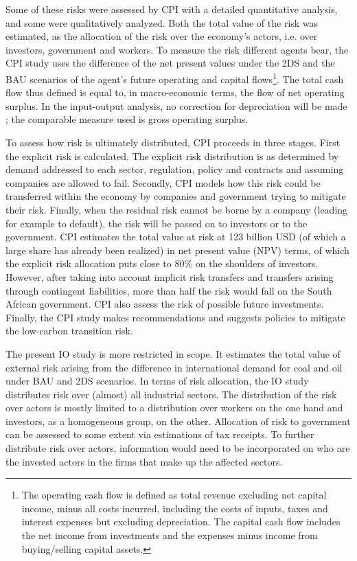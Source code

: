 \documentclass[12pt,english]{article}
\begin{document}
Some of these risks were assessed by CPI with a detailed quantitative analysis, and some were qualitatively analyzed. Both the total value of the risk was estimated, as the allocation of the risk over the economy's actors, i.e. over investors, government and workers. To measure the risk different agents bear, the CPI study uses the difference of the net present values under the 2DS and the BAU scenarios of the agent's future operating and capital flows\footnote{The operating cash flow is defined as total revenue excluding net capital income, minus all costs incurred, including the costs of inputs, taxes and interest expenses but excluding depreciation. The capital cash flow includes the net income from investments and the expenses minus income from buying/selling capital assets.}. The total cash flow thus defined is equal to, in macro-economic terms, the flow of net operating surplus. In the input-output analysis, no correction for depreciation will be made ; the comparable measure used is gross operating surplus.

To assess how risk is ultimately distributed, CPI proceeds in three stages. First the explicit risk is calculated. The explicit risk distribution is as determined by demand addressed to each sector, regulation, policy and contracts and assuming companies are allowed to fail. Secondly, CPI models how this risk could be transferred within the economy by companies and government trying to mitigate their risk. Finally, when the residual risk cannot be borne by a company (leading for example to default), the risk will be passed on to investors or to the government. 
CPI estimates the total value at risk at 123 billion USD (of which a large share has already been realized) in net present value (NPV) terms, of which the explicit risk allocation puts close to 80\% on the shoulders of investors. However, after taking into account implicit risk transfers and transfers arising through contingent liabilities, more than half the risk would fall on the South African government. CPI also assess the risk of possible future investments. Finally, the CPI study makes recommendations and suggests policies to mitigate the low-carbon transition risk.

The present IO study is more restricted in scope. It estimates the total value of external risk arising from the difference in international demand for coal and oil under BAU and 2DS scenarios. In terms of risk allocation, the IO study distributes risk over (almost) all industrial sectors. The distribution of the risk over actors is mostly limited to a distribution over workers on the one hand and investors, as a homogeneous group, on the other. Allocation of risk to government can be assessed to some extent via estimations of tax receipts. To further distribute risk over actors, information would need to be incorporated on who are the invested actors in the firms that make up the affected sectors. 
\end{document}
